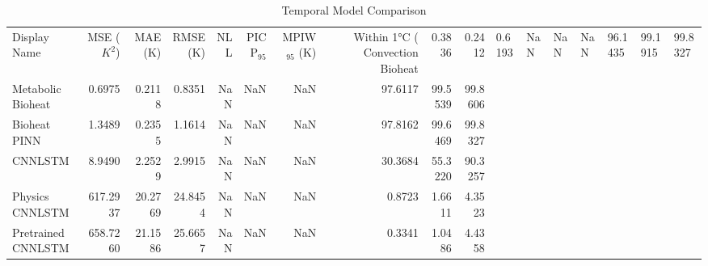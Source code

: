 \begin{table}
\caption{Temporal Model Comparison}
\begin{tabular}{lrrrrrrrrr}
\toprule
Display Name & MSE ($K^2$) & MAE (K) & RMSE (K) & NLL & PICP$_{95}$ & MPIW$_{95}$ (K) & Within 1°C (%
\midrule
Convection Bioheat & 0.3836 & 0.2412 & 0.6193 & NaN & NaN & NaN & 96.1435 & 99.1915 & 99.8327 \\
Metabolic Bioheat & 0.6975 & 0.2118 & 0.8351 & NaN & NaN & NaN & 97.6117 & 99.5539 & 99.8606 \\
Bioheat PINN & 1.3489 & 0.2355 & 1.1614 & NaN & NaN & NaN & 97.8162 & 99.6469 & 99.8327 \\
CNNLSTM & 8.9490 & 2.2529 & 2.9915 & NaN & NaN & NaN & 30.3684 & 55.3220 & 90.3257 \\
Physics CNNLSTM & 617.2937 & 20.2769 & 24.8454 & NaN & NaN & NaN & 0.8723 & 1.6611 & 4.3523 \\
Pretrained CNNLSTM & 658.7260 & 21.1586 & 25.6657 & NaN & NaN & NaN & 0.3341 & 1.0486 & 4.4358 \\
\bottomrule
\end{tabular}
\end{table}
